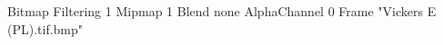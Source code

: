 {Bitmap
	{Filtering 1}
	{Mipmap 1}
	{Blend none}
	{AlphaChannel 0}
	{Frame "Vickers E (PL).tif.bmp"}
}
